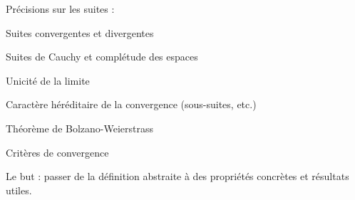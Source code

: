 
\minitoc  %

Précisions sur les suites : 

Suites convergentes et divergentes

Suites de Cauchy et complétude des espaces

Unicité de la limite

Caractère héréditaire de la convergence (sous-suites, etc.)

Théorème de Bolzano-Weierstrass 

Critères de convergence 

Le but : passer de la définition abstraite à des propriétés concrètes et résultats utiles.